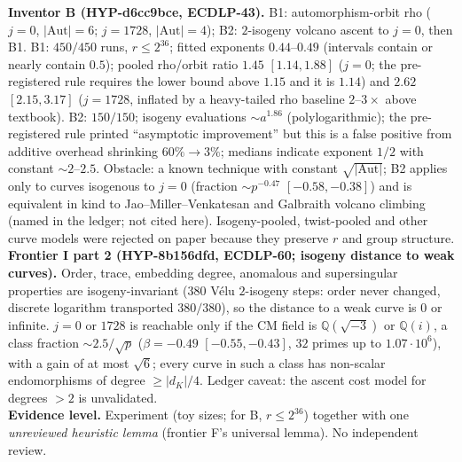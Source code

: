 \documentclass[11pt,a4paper]{article}
\theoremstyle{remark}
\begin{document}
\textbf{Inventor B (\mbox{HYP-d6cc9bce}, ECDLP-43).} B1: automorphism-orbit rho ($j=0$, $|\mathrm{Aut}|=6$; $j=1728$, $|\mathrm{Aut}|=4$); B2: $2$-isogeny volcano ascent to $j=0$, then B1. B1: $450/450$ runs, $r\le2^{36}$; fitted exponents $0.44$--$0.49$ (intervals contain or nearly contain $0.5$); pooled rho/orbit ratio $1.45$ $[1.14,1.88]$ ($j=0$; the pre-registered rule requires the lower bound above $1.15$ and it is $1.14$) and $2.62$ $[2.15,3.17]$ ($j=1728$, inflated by a heavy-tailed rho baseline $2$--$3\times$ above textbook). B2: $150/150$; isogeny evaluations $\sim a^{1.86}$ (polylogarithmic); the pre-registered rule printed ``asymptotic improvement'' but this is a false positive from additive overhead shrinking $60\%\to3\%$; medians indicate exponent $1/2$ with constant $\sim2$--$2.5$. Obstacle: a known technique with constant $\sqrt{|\mathrm{Aut}|}$; B2 applies only to curves isogenous to $j=0$ (fraction $\sim p^{-0.47}$ $[-0.58,-0.38]$) and is equivalent in kind to Jao--Miller--Venkatesan and Galbraith volcano climbing (named in the ledger; not cited here). Isogeny-pooled, twist-pooled and other curve models were rejected on paper because they preserve $r$ and group structure.\\
\textbf{Frontier I part 2 (\mbox{HYP-8b156dfd}, ECDLP-60; isogeny distance to weak curves).} Order, trace, embedding degree, anomalous and supersingular properties are isogeny-invariant ($380$ V\'elu $2$-isogeny steps: order never changed, discrete logarithm transported $380/380$), so the distance to a weak curve is $0$ or infinite. $j=0$ or $1728$ is reachable only if the CM field is $\mathbb Q(\sqrt{-3})$ or $\mathbb Q(i)$, a class fraction $\sim2.5/\sqrt p$ ($\beta=-0.49$ $[-0.55,-0.43]$, $32$ primes up to $1.07\cdot10^6$), with a gain of at most $\sqrt6$; every curve in such a class has non-scalar endomorphisms of degree $\ge|d_K|/4$. Ledger caveat: the ascent cost model for degrees $>2$ is unvalidated.\\
\textbf{Evidence level.} Experiment (toy sizes; for B, $r\le2^{36}$) together with one \emph{unreviewed heuristic lemma} (frontier F's universal lemma). No independent review.
\end{document}
